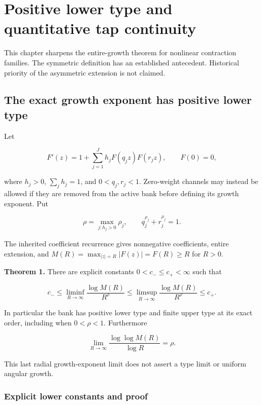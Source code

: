 \hypertarget{positive-lower-type-and-quantitative-tap-continuity}{%
\section{Positive lower type and quantitative tap
continuity}\label{positive-lower-type-and-quantitative-tap-continuity}}

This chapter sharpens the entire-growth theorem for nonlinear contraction families. The symmetric definition has an established antecedent. Historical priority of the asymmetric extension is not claimed.

\hypertarget{the-exact-growth-exponent-has-positive-lower-type}{%
\subsection{The exact growth exponent has positive lower
type}\label{the-exact-growth-exponent-has-positive-lower-type}}

Let

\[
F'(z)=1+\sum_{j=1}^{J}h_jF(q_jz)F(r_jz),\qquad F(0)=0,
\]

where \(h_j>0\), \(\sum_jh_j=1\), and \(0<q_j,r_j<1\). Zero-weight
channels may instead be allowed if they are removed from the active bank
before defining its growth exponent. Put

\[
\rho=\max_{j:h_j>0}\rho_j,\qquad q_j^{\rho_j}+r_j^{\rho_j}=1.
\]

The inherited coefficient recurrence gives nonnegative coefficients,
entire extension, and \(M(R)=\max_{|z|=R}|F(z)|=F(R)\ge R\) for \(R>0\).

\textbf{Theorem 1.} There are explicit constants \(0<c_-\le c_+<\infty\)
such that

\[
c_-\le\liminf_{R\to\infty}\frac{\log M(R)}{R^\rho}
\le\limsup_{R\to\infty}\frac{\log M(R)}{R^\rho}\le c_+.
\]

In particular the bank has positive lower type and finite upper type at
its exact order, including when \(0<\rho<1\). Furthermore

\[
\lim_{R\to\infty}\frac{\log\log M(R)}{\log R}=\rho.
\]

This last radial growth-exponent limit does not assert a type limit or
uniform angular growth.

\hypertarget{explicit-lower-constants-and-proof}{%
\subsubsection{Explicit lower constants and
proof}\label{explicit-lower-constants-and-proof}}

